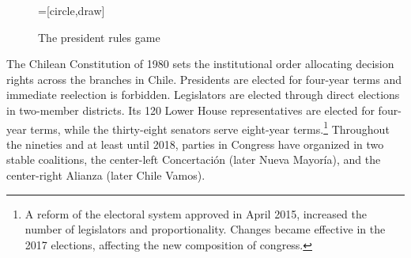 \documentclass[letter,12pt]{article}
\begin{document}
\begin{figure}
  \centering
    \caption{The president rules game}\label{F:game}
    =[circle,draw]
\end{figure}


The Chilean Constitution of 1980 sets the institutional order allocating decision rights across the branches in Chile. Presidents are elected for four-year terms and immediate reelection is forbidden. Legislators are elected through direct elections in two-member districts. Its 120 Lower House representatives are elected for four-year terms, while the thirty-eight senators serve eight-year terms.\footnote{A reform of the electoral system approved in April 2015, increased the number of legislators and proportionality. Changes became effective in the 2017 elections, affecting the new composition of congress.} Throughout the nineties and at least until 2018, parties in Congress have organized in two stable coalitions, the center-left Concertación (later Nueva Mayoría), and the center-right Alianza (later Chile Vamos). 
\end{document}
